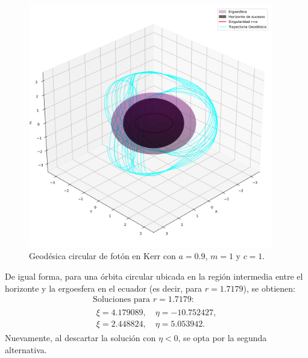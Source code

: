 \begin{figure}[H]
    \begin{small}
        \begin{center}
            \includegraphics[width=0.95\textwidth]{AgujerosNegros/kerr/geodesics_plots/geodesica_circular_foton_r3.png}
        \end{center}
        \caption{Geodésica circular de fotón en Kerr con $a = 0.9$, $m=1$ y $c=1$.}
        \label{fig:geodesica_circular_foton_r3}
    \end{small}
\end{figure}

De igual forma, para una órbita circular ubicada en la región intermedia entre el horizonte y la ergoesfera en el ecuador (es decir, para $r=1.7179$), se obtienen:
\begin{equation}
    \begin{array}{l}
        \text{Soluciones para } r=1.7179: \\
        \begin{array}{l}
            \xi = 4.179089,\quad \eta = -10.752427, \\
            \xi = 2.448824,\quad \eta = 5.053942.
        \end{array}
    \end{array}
\end{equation}
Nuevamente, al descartar la solución con $\eta < 0$, se opta por la segunda alternativa.

